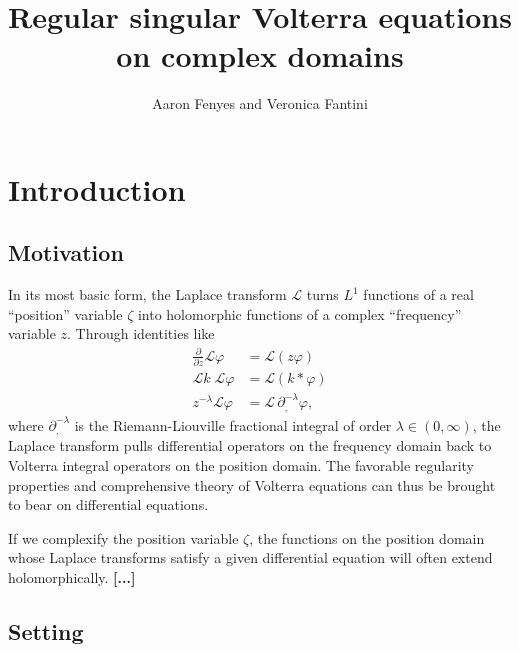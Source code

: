 \documentclass{article}
\title{Regular singular Volterra equations on complex domains}
\author{Aaron Fenyes and Veronica Fantini}
\date{}
\theoremstyle{plain}
\newcommand{\laplace}{\mathcal{L}}
\newcommand{\fracderiv}[3]{\partial^{#1}_{#2, #3}}
\begin{document}
\maketitle
\section{Introduction}
\subsection{Motivation}\label{motivation}
In its most basic form, the Laplace transform $\laplace$ turns $L^1$ functions of a real ``position'' variable $\zeta$ into holomorphic functions of a complex ``frequency'' variable $z$. Through identities like
\begin{align*}
\frac{\partial}{\partial z} \laplace \varphi & = \laplace(z\varphi) \\
\laplace k\;\laplace \varphi & = \laplace(k * \varphi) \\
z^{-\lambda} \laplace \varphi & = \laplace\,\fracderiv{-\lambda}{}{} \varphi,
\end{align*}
where $\fracderiv{-\lambda}{}{}$ is the Riemann-Liouville fractional integral of order $\lambda \in (0, \infty)$, the Laplace transform pulls differential operators on the frequency domain back to Volterra integral operators on the position domain. The favorable regularity properties and comprehensive theory of Volterra equations can thus be brought to bear on differential equations.

If we complexify the position variable $\zeta$, the functions on the position domain whose Laplace transforms satisfy a given differential equation will often extend holomorphically. \textbf{[...]}

\subsection{Setting}\label{setting}
\end{document}
